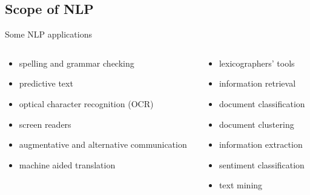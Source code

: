 \documentclass[compress]{beamer}
\begin{document}
\subsection{Scope of NLP}

\begin{frame}{Some NLP applications} 
  \begin{columns}
    \begin{column}{.5\textwidth}
      \begin{itemize}
      \item spelling and grammar checking
      \item predictive text
      \item optical character recognition (OCR)
      \item screen readers 
      \item augmentative and alternative communication
      \item machine aided translation 
      \end{itemize}
    \end{column}
    
    \begin{column}{.5\textwidth}
      \begin{itemize}
      \item lexicographers' tools 
      \item information retrieval
      \item document classification 
      \item document clustering
      \item information extraction
      \item sentiment classification
      \item text mining
      \end{itemize}
    \end{column}
  \end{columns}
\end{frame} 
\end{document}
